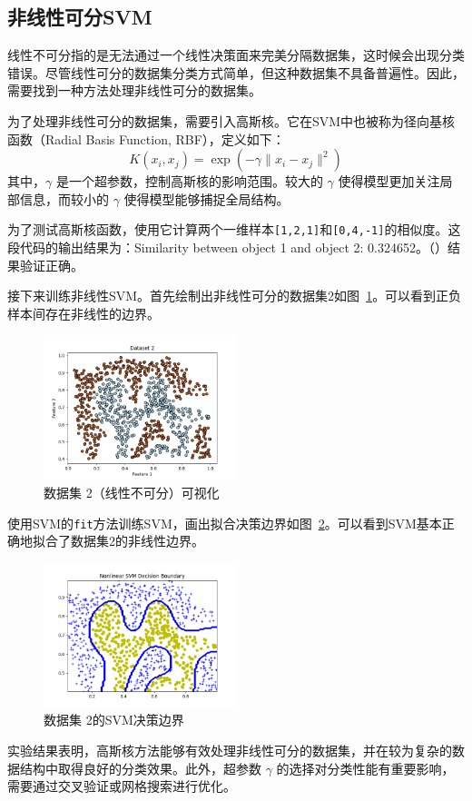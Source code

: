\documentclass{SEU-AI-Report}
\begin{document}
\subsection{非线性可分SVM}

线性不可分指的是无法通过一个线性决策面来完美分隔数据集，这时候会出现分类错误。尽管线性可分的数据集分类方式简单，但这种数据集不具备普遍性。因此，需要找到一种方法处理非线性可分的数据集。

为了处理非线性可分的数据集，需要引入高斯核。它在SVM中也被称为径向基核函数（Radial Basis Function, RBF），定义如下：
\begin{equation}
K(x_i, x_j) = \exp\left(-\gamma \|x_i - x_j\|^2\right)
\end{equation}
其中，$\gamma$ 是一个超参数，控制高斯核的影响范围。较大的 $\gamma$ 使得模型更加关注局部信息，而较小的 $\gamma$ 使得模型能够捕捉全局结构。

为了测试高斯核函数，使用它计算两个一维样本\texttt{[1,2,1]}和\texttt{[0,4,-1]}的相似度。这段代码的输出结果为：Similarity between object 1 and object 2: 0.324652。（）结果验证正确。

接下来训练非线性SVM。首先绘制出非线性可分的数据集2如图~\ref{fig:dataset2}。可以看到正负样本间存在非线性的边界。
\begin{figure}[htbp]
    \centering
    \includegraphics[width=0.5\textwidth]{figure/fig4.png}
    \caption{数据集 2（线性不可分）可视化}
    \label{fig:dataset2}
\end{figure}

使用SVM的\texttt{fit}方法训练SVM，画出拟合决策边界如图~\ref{fig:result2}。可以看到SVM基本正确地拟合了数据集2的非线性边界。

\begin{figure}[htbp]
    \centering
    \includegraphics[width=0.5\textwidth]{figure/fig5.png}
    \caption{数据集 2的SVM决策边界}
    \label{fig:result2}
\end{figure}
实验结果表明，高斯核方法能够有效处理非线性可分的数据集，并在较为复杂的数据结构中取得良好的分类效果。此外，超参数 $\gamma$ 的选择对分类性能有重要影响，需要通过交叉验证或网格搜索进行优化。
\end{document}
